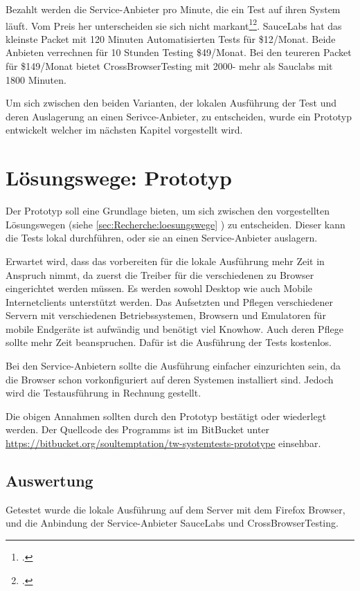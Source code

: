 Bezahlt werden die Service-Anbieter pro Minute, die ein Test auf ihren System läuft. Vom Preis her unterscheiden sie sich nicht markant\footcite{Sauce_Labs_Pricing_2015-07-26}\footcite{Test_your_site_on_all_browsers_2015-07-26}. SauceLabs hat das kleinste Packet mit 120 Minuten Automatisierten Tests für \$12/Monat. Beide Anbieten verrechnen für 10 Stunden Testing \$49/Monat. Bei den teureren Packet für \$149/Monat bietet CrossBrowserTesting mit 2000- mehr als Sauclabs mit 1800 Minuten.

Um sich zwischen den beiden Varianten, der lokalen Ausführung der Test und deren Auslagerung an einen Serivce-Anbieter, zu entscheiden, wurde ein Prototyp entwickelt welcher im nächsten Kapitel vorgestellt wird.

\section{Lösungswege: Prototyp}
Der Prototyp soll eine Grundlage bieten, um sich zwischen den vorgestellten Lösungswegen (siehe \cref{sec:Recherche:loesungswege} ) zu entscheiden. Dieser kann die Tests lokal durchführen, oder sie an einen Service-Anbieter auslagern.

Erwartet wird, dass das vorbereiten für die lokale Ausführung mehr Zeit in Anspruch nimmt, da zuerst die Treiber für die verschiedenen zu Browser eingerichtet werden müssen. Es werden sowohl Desktop wie auch Mobile Internetclients unterstützt werden. Das Aufsetzten und Pflegen verschiedener Servern mit verschiedenen Betriebssystemen, Browsern und Emulatoren für mobile Endgeräte ist aufwändig und benötigt viel Knowhow. Auch deren Pflege sollte mehr Zeit beanspruchen. Dafür ist die Ausführung der Tests kostenlos.

Bei den Service-Anbietern sollte die Ausführung einfacher einzurichten sein, da die Browser schon vorkonfiguriert auf deren Systemen installiert sind. Jedoch wird die Testausführung in Rechnung gestellt. 

Die obigen Annahmen sollten durch den Prototyp bestätigt oder wiederlegt werden. Der Quellcode des Programms ist im BitBucket unter \url{https://bitbucket.org/soultemptation/tw-systemtests-prototype} einsehbar.

\subsection{Auswertung}
Getestet wurde die lokale Ausführung auf dem Server mit dem Firefox Browser, und die Anbindung der Service-Anbieter SauceLabs und CrossBrowserTesting. 


